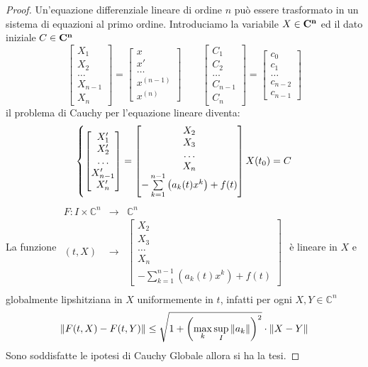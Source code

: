 \begin{proof}
	Un'equazione differenziale lineare di ordine $n$ può essere trasformato in un sistema di equazioni al primo ordine.
	Introduciamo la variabile $X\in\mathbb{\mathbf{C^{n}}}$ ed il dato iniziale $C\in\mathbb{\mathbf{C^{n}}}$
	$$\left[\begin{matrix} X_1\\X_2\\\ldots\\X_{n-1}\\X_n \end{matrix}\right] = \left[\begin{matrix} x\\ x'\\\ldots\\ x^{(n-1)}\\x^{(n)} \end{matrix}\right]\quad\quad\left[\begin{matrix} C_1\\C_2\\\ldots\\C_{n-1}\\C_{n} \end{matrix}\right] = \left[\begin{matrix} c_0\\c_1\\\ldots\\ c_{n-2}\\c_{n-1} \end{matrix}\right]$$
	il problema di Cauchy per l'equazione lineare diventa:
	$$
	\left\{
	\left[\begin{matrix} X_1'\\X_2'\\\ldots\\X_{n-1}'\\X_n' \end{matrix}\right]
	=
	\left[\begin{matrix} X_2\\X_3\\\ldots\\X_{n}\\-\sum\limits_{k=1}^{n-1}\left(a_k(t)x^k\right)+f(t) \end{matrix}\right]
	\\
	X(t_0)=C
	\right.
	$$
	La funzione
	$\begin{array}{rcl} 
	F: I\times\mathbb{C}^n & \to & \mathbb{C}^n \\
	   (t,X) & \to & \left[\begin{matrix} X_2\\X_3\\\ldots\\X_{n}\\-\sum\limits_{k=1}^{n-1}\left(a_k(t)x^k\right)+f(t) \end{matrix}\right] \\ 
	\end{array}$
	è lineare in $X$ e globalmente lipshitziana in $X$ uniformemente in $t$, infatti per ogni $X,Y\in\mathbb{C}^n$
	$$\left\|F(t,X)-F(t,Y)\right\|\le \sqrt{1+\left( \max\limits_k \sup\limits_I \left\|a_k\right\| \right)^2}\cdot\left\|X-Y\right\|$$
	Sono soddisfatte le ipotesi di Cauchy Globale allora si ha la tesi.
\end{proof}
